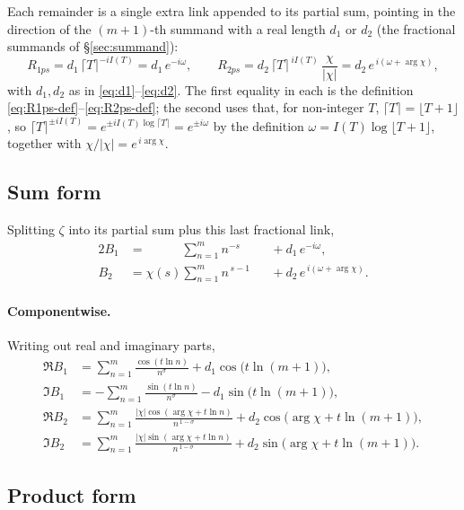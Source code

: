 \documentclass[11pt]{article}
\theoremstyle{definition}
\begin{document}
Each remainder is a single extra link appended to its partial sum,
pointing in the direction of the $(m+1)$-th summand with a real length $d_1$ or
$d_2$ (the fractional summands of \S\ref{sec:summand}):
\begin{equation}\label{eq:R-phasors}
R_{1ps}=d_1\,\lceil T\rceil^{-iI(T)}=d_1\,e^{-i\omega},\qquad
R_{2ps}=d_2\,\lceil T\rceil^{\,iI(T)}\,\frac{\chi}{|\chi|}=d_2\,e^{\,i(\omega+\arg\chi)},
\end{equation}
with $d_1,d_2$ as in \eqref{eq:d1}--\eqref{eq:d2}. The first equality in each is
the definition \eqref{eq:R1ps-def}--\eqref{eq:R2ps-def}; the second uses that, for
non-integer $T$, $\lceil T\rceil=\lfloor T+1\rfloor$, so
$\lceil T\rceil^{\pm iI(T)}=e^{\pm iI(T)\log\lceil T\rceil}=e^{\pm i\omega}$ by the
definition $\omega=I(T)\log\lfloor T+1\rfloor$, together with
$\chi/|\chi|=e^{\,i\arg\chi}$.

\subsection{Sum form}\label{sec:sum-form}

Splitting $\zeta$ into its partial sum plus this last
fractional link,
\begin{alignat}{2}
B_1 &= \phantom{\chi(s)}\sum_{n=1}^{m} n^{-s}    &&{}+ d_1\,e^{-i\omega}, \label{eq:B1-sum}\\
B_2 &= \chi(s)\sum_{n=1}^{m} n^{\,s-1}           &&{}+ d_2\,e^{\,i(\omega+\arg\chi)}. \label{eq:B2-sum}
\end{alignat}

\paragraph{Componentwise.} Writing out real and imaginary parts,
\begin{align}
\Re B_1 &= \sum_{n=1}^{m}\frac{\cos(t\ln n)}{n^{\sigma}} + d_1\cos\bigl(t\ln(m+1)\bigr),\\
\Im B_1 &= -\sum_{n=1}^{m}\frac{\sin(t\ln n)}{n^{\sigma}} - d_1\sin\bigl(t\ln(m+1)\bigr),\\
\Re B_2 &= \sum_{n=1}^{m}\frac{|\chi|\cos(\arg\chi+t\ln n)}{n^{\,1-\sigma}} + d_2\cos\bigl(\arg\chi+t\ln(m+1)\bigr),\\
\Im B_2 &= \sum_{n=1}^{m}\frac{|\chi|\sin(\arg\chi+t\ln n)}{n^{\,1-\sigma}} + d_2\sin\bigl(\arg\chi+t\ln(m+1)\bigr).
\end{align}

\subsection{Product form}\label{sec:product-form}
\end{document}
